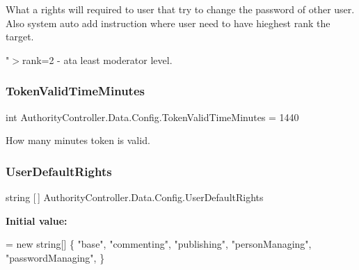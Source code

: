 What a rights will required to user that try to change the password of other user. Also system auto add instruction where user need to have hieghest rank the target. 

"$>$rank=2 -\/ ata least moderator level. \mbox{\label{class_authority_controller_1_1_data_1_1_config_aa0988724b8c2413203508f2819689750}} 
\subsubsection{\texorpdfstring{Token\+Valid\+Time\+Minutes}{TokenValidTimeMinutes}}
{\footnotesize\ttfamily int Authority\+Controller.\+Data.\+Config.\+Token\+Valid\+Time\+Minutes = 1440}



How many minutes token is valid. 

\mbox{\label{class_authority_controller_1_1_data_1_1_config_a084ad964d1a25e70e5a4e88cca031cbf}} 
\subsubsection{\texorpdfstring{User\+Default\+Rights}{UserDefaultRights}}
{\footnotesize\ttfamily string \mbox{[}$\,$\mbox{]} Authority\+Controller.\+Data.\+Config.\+User\+Default\+Rights}

{\bfseries Initial value\+:}
\begin{DoxyCode}
= \textcolor{keyword}{new} \textcolor{keywordtype}{string}[]
        \{
            \textcolor{stringliteral}{"base"},
            \textcolor{stringliteral}{"commenting"},
            \textcolor{stringliteral}{"publishing"},
            \textcolor{stringliteral}{"personManaging"},
            \textcolor{stringliteral}{"passwordManaging"},
        \}
\end{DoxyCode}


